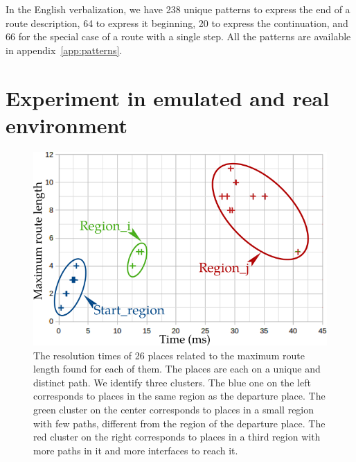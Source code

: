 In the English verbalization, we have 238 unique patterns to express the end of a route description, 64 to express it beginning, 20 to express the continuation, and 66 for the special case of a route with a single step. All the patterns are available in appendix~\ref{app:patterns}.

\section{Experiment in emulated and real environment}


\begin{figure}[ht!]
\centering
\includegraphics[scale=0.6]{figures/chapter3/performance.png}
\caption{\label{fig:chap3_performance} The resolution times of 26 places related to the maximum route length found for each of them. The places are each on a unique and distinct path. We identify three clusters. The blue one on the left corresponds to places in the same region as the departure place. The green cluster on the center corresponds to places in a small region with few paths, different from the region of the departure place. The red cluster on the right corresponds to places in a third region with more paths in it and more interfaces to reach it. }
\end{figure}


